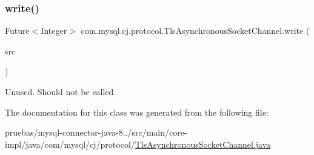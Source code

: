 \mbox{\label{classcom_1_1mysql_1_1cj_1_1protocol_1_1_tls_asynchronous_socket_channel_a993f4bc3833dc8db73f3163954faca33}} 
\subsubsection{\texorpdfstring{write()}{write()}}
{\footnotesize\ttfamily Future$<$Integer$>$ com.\+mysql.\+cj.\+protocol.\+Tls\+Asynchronous\+Socket\+Channel.\+write (\begin{DoxyParamCaption}\item[{Byte\+Buffer}]{src }\end{DoxyParamCaption})}

Unused. Should not be called. 

The documentation for this class was generated from the following file\+:\begin{DoxyCompactItemize}
\item 
pruebas/mysql-\/connector-\/java-\/8../src/main/core-\/impl/java/com/mysql/cj/protocol/\mbox{\hyperlink{_tls_asynchronous_socket_channel_8java}{Tls\+Asynchronous\+Socket\+Channel.\+java}}\end{DoxyCompactItemize}
